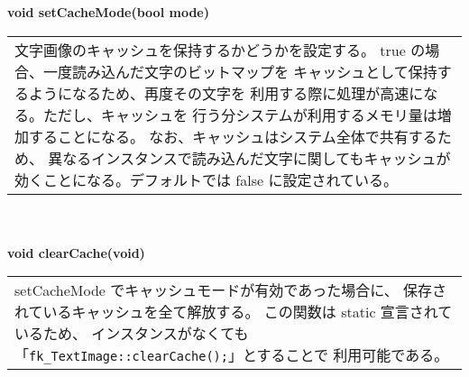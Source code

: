 \begin{tabbing}
\> \textbf{void setCacheMode(bool mode)} \\
	\> \> \begin{tabular}{p{15cm}}
		文字画像のキャッシュを保持するかどうかを設定する。
		true の場合、一度読み込んだ文字のビットマップを
		キャッシュとして保持するようになるため、再度その文字を
		利用する際に処理が高速になる。ただし、キャッシュを
		行う分システムが利用するメモリ量は増加することになる。
		なお、キャッシュはシステム全体で共有するため、
		異なるインスタンスで読み込んだ文字に関してもキャッシュが
		効くことになる。デフォルトでは false に設定されている。
	\end{tabular} \\ \\

\> \textbf{void clearCache(void)} \\
	\> \> \begin{tabular}{p{15cm}}
		setCacheMode でキャッシュモードが有効であった場合に、
		保存されているキャッシュを全て解放する。
		この関数は static 宣言されているため、
		インスタンスがなくても
		「\verb+fk_TextImage::clearCache();+」とすることで
		利用可能である。
	\end{tabular} \\ \\

\end{tabbing}

